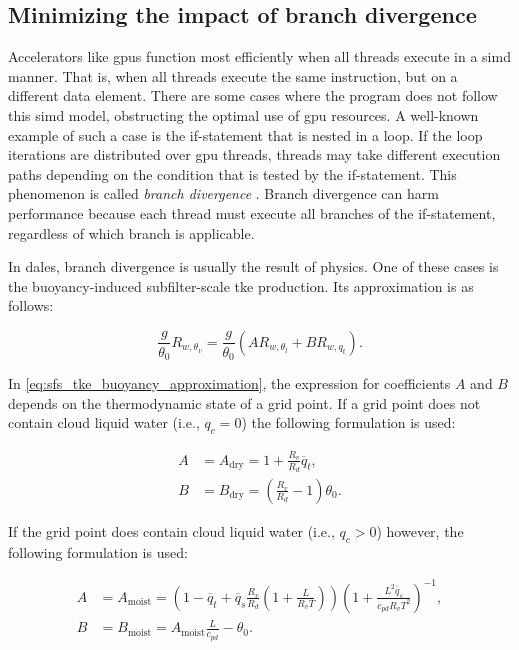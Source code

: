 \subsection{Minimizing the impact of branch divergence}
Accelerators like \acrshort{gpu}s function most efficiently when all threads execute in a \acrshort{simd} manner. That is, when all threads execute the same instruction, but on a different data element. There are some cases where the program does not follow this \acrshort{simd} model, obstructing the optimal use of \acrshort{gpu} resources. A well-known example of such a case is the if-statement that is nested in a loop. If the loop iterations are distributed over \acrshort{gpu} threads, threads may take different execution paths depending on the condition that is tested by the if-statement. This phenomenon is called \emph{branch divergence} \citep{hanReducingBranchDivergence2011}. Branch divergence can harm performance because each thread must execute all branches of the if-statement, regardless of which branch is applicable. 

In \acrshort{dales}, branch divergence is usually the result of physics. One of these cases is the buoyancy-induced subfilter-scale \acrshort{tke} production. Its approximation is as follows:

\begin{equation}
  \frac{g}{\theta_0}R_{w,\theta_v} = \frac{g}{\theta_0} \left( A R_{w,\theta_l} + B R_{w,q_t} \right). \label{eq:sfs_tke_buoyancy_approximation}
\end{equation}

In \autoref{eq:sfs_tke_buoyancy_approximation}, the expression for coefficients $A$ and $B$ depends on the thermodynamic state of a grid point. If a grid point does not contain cloud liquid water (i.e., $q_c=0$) the following formulation is used:

\begin{equation}
  \begin{split}
    A &= A_{\text{dry}} = 1 + \frac{R_v}{R_d}\overline{q}_t, \\
    B &= B_{\text{dry}} = \left( \frac{R_v}{R_d} - 1 \right) \theta_0.
  \end{split}
  \label{eq:dry_coefficients}
\end{equation}

If the grid point does contain cloud liquid water (i.e., $q_c>0$) however, the following formulation is used: 

\begin{equation}
  \begin{split}
    A &= A_{\text{moist}} = \left( 1 - \overline{q}_t + \overline{q}_s \frac{R_v}{R_d} \left( 1 + \frac{L}{R_v T} \right) \right) \left(1 + \frac{L^2 \overline{q}_s}{c_{pd} R_v T^2} \right)^{-1}, \\
    B &= B_{\text{moist}} = A_{\text{moist}} \frac{L}{c_{pd}} - \theta_0.
  \end{split}
  \label{eq:wet_coefficients}
\end{equation}

